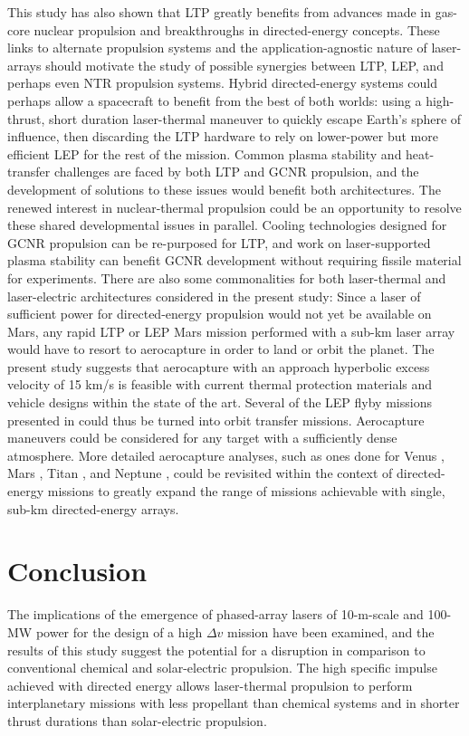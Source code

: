 \documentclass[final,3p,times,twocolumn,sort&compress, lefttitle]{elsarticle}
\newcommand{\rev}[1]{\textcolor{red}{#1}}
\renewcommand{\rev}[1]{#1}  %
\begin{document}
        This study has also shown that LTP greatly benefits from advances made in gas-core nuclear propulsion and breakthroughs in directed-energy concepts. These links to alternate propulsion systems and the application-agnostic nature of laser-arrays should motivate the study of possible synergies between LTP, LEP, and perhaps even NTR propulsion systems. Hybrid directed-energy systems could perhaps allow a spacecraft to benefit from the best of both worlds: using a high-thrust, short duration laser-thermal maneuver to quickly escape Earth's sphere of influence, then discarding the LTP hardware to rely on lower-power but more efficient LEP for the rest of the mission. Common plasma stability and heat-transfer challenges are faced by both LTP and GCNR propulsion, and the development of solutions to these issues would benefit both architectures. \rev{The renewed interest in nuclear-thermal propulsion \cite{skelly_nasa_2021, skelly_nuclear_2021} could be an opportunity to resolve these shared developmental issues in parallel. Cooling technologies designed for GCNR propulsion can be re-purposed for LTP, and work on laser-supported plasma stability can benefit GCNR development without requiring fissile material for experiments.} There are also some commonalities for both laser-thermal and laser-electric architectures considered in the present study: Since a laser of sufficient power for directed-energy propulsion would not yet be available on Mars, any rapid LTP or LEP Mars mission performed with a sub-km laser array would have to resort to aerocapture in order to land or orbit the planet. The present study suggests that aerocapture with an approach hyperbolic excess velocity of 15 km/s is feasible with current thermal protection materials and vehicle designs within the state of the art. Several of the LEP flyby missions presented in \cite{sheerin_fast_2021} could thus be turned into orbit transfer missions. Aerocapture maneuvers could be considered for any target with a sufficiently dense atmosphere. More detailed aerocapture analyses, such as ones done for Venus \cite{lockwood_systems_2006}, Mars \cite{wright_mars_2006}, Titan \cite{lockwood_titan_2003}, and Neptune \cite{lockwood_aerocapture_2006}, could be revisited within the context of directed-energy missions to greatly expand the range of missions achievable with single, sub-km directed-energy arrays.

    \section{Conclusion}
        The implications of the emergence of phased-array lasers of 10-m-scale and 100-MW power for the design of a high $\Delta v$ mission have been examined, and the results of this study suggest the potential for a disruption in comparison to conventional chemical and solar-electric propulsion. The high specific impulse achieved with directed energy allows laser-thermal propulsion to perform interplanetary missions with less propellant than chemical systems and in shorter thrust durations than solar-electric propulsion.
\end{document}
